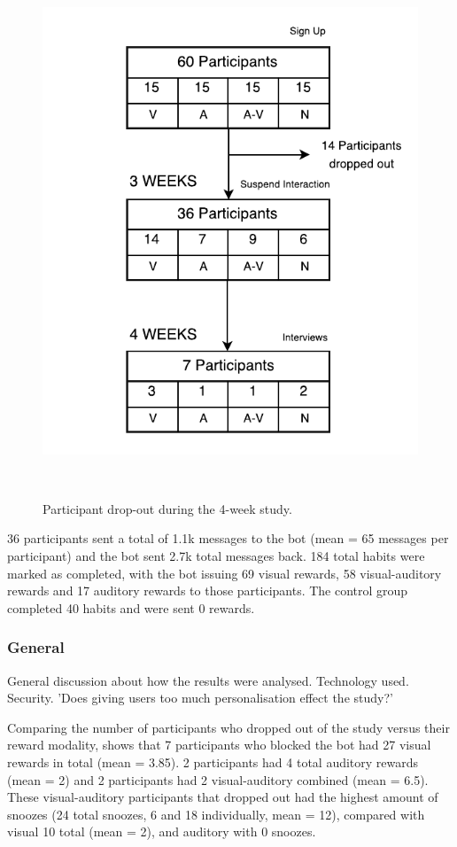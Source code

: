 \begin{figure}
  \centering
  \includegraphics[width=.75\columnwidth]{resources/figures/study-flow.pdf}
  \caption{Participant drop-out during the 4-week study.}~\label{fig:study_dropout}
\end{figure}

36 participants sent a total of 1.1k messages to the bot (mean = 65 messages per participant) and the bot sent 2.7k total messages back. 184 total habits were marked as completed, with the bot issuing 69 visual rewards, 58 visual-auditory rewards and 17 auditory rewards to those participants. The control group completed 40 habits and were sent 0 rewards.


\subsubsection*{General}
General discussion about how the results were analysed. Technology used. Security.\newline
'Does giving users too much personalisation effect the study?'\newline



Comparing the number of participants who dropped out of the study versus their reward modality, shows that 7 participants who blocked the bot had 27 visual rewards in total (mean = 3.85). 2 participants had 4 total auditory rewards (mean = 2) and 2 participants had 2 visual-auditory combined (mean = 6.5). These visual-auditory participants that dropped out had the highest amount of snoozes (24 total snoozes, 6 and 18 individually, mean = 12), compared with visual 10 total (mean = 2), and auditory with 0 snoozes.

